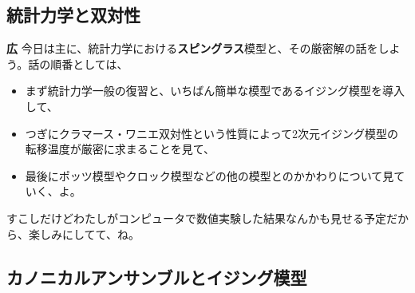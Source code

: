 \documentclass[paper=b5j,fontsize=12Q,jafontsize=12Q,baselineskip=21Q]{jlreq}
\DeclareRobustCommand{\hiron}{\textbf{広 }}
\begin{document}
\begin{refsection}
\printbibliography[heading=subbibliography, title={参考文献}]
\end{refsection}

\begin{refsection}
\section{統計力学と双対性}
\hiron 今日は主に、統計力学における\textbf{スピングラス}模型と、その厳密解の話をしよう。話の順番としては、
\begin{itemize}
  \item まず統計力学一般の復習と、いちばん簡単な模型であるイジング模型を導入して、
  \item つぎにクラマース・ワニエ双対性という性質によって2次元イジング模型の転移温度が厳密に求まることを見て、
  \item 最後にポッツ模型やクロック模型などの他の模型とのかかわりについて見ていく、よ。
\end{itemize}
すこしだけどわたしがコンピュータで数値実験した結果なんかも見せる予定だから、楽しみにしてて、ね。

\subsection{カノニカルアンサンブルとイジング模型}

\end{refsection}
\end{document}
